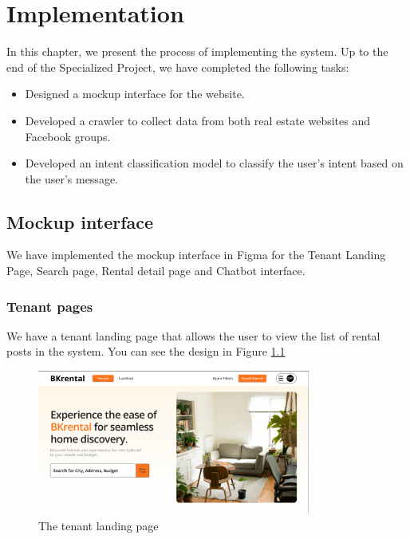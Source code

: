 \chapter{Implementation}
In this chapter, we present the process of implementing the system. Up to the end of the Specialized Project, we have completed the following tasks:
\begin{itemize}
    \item Designed a mockup interface for the website.
    \item Developed a crawler to collect data from both real estate websites and Facebook groups.
    \item Developed an intent classification model to classify the user's intent based on the user's message.
\end{itemize}

\section{Mockup interface}
We have implemented the mockup interface in Figma for the Tenant Landing Page, Search page, Rental detail page and Chatbot interface.

\subsection{Tenant pages}
We have a tenant landing page that allows the user to view the list of rental posts in the system. You can see the design in Figure \ref{fig:tenant-landing-page}

\clearpage
\begin{figure}[ht]
    \centering
    \includegraphics[width=0.8\textwidth]{Images/Mockup/landing_page.png}
    \caption{The tenant landing page}
    \label{fig:tenant-landing-page}
\end{figure}

